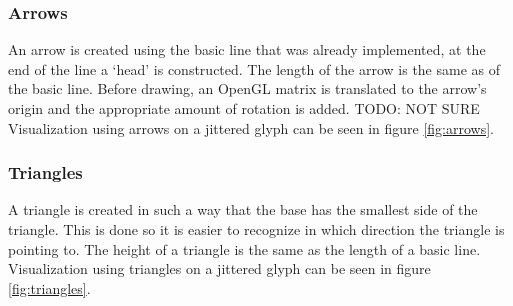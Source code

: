 		\subsubsection*{Arrows}
			An arrow is created using the basic line that was already implemented, at the end of the line a `head' is constructed.
			The length of the arrow is the same as of the basic line. 
			Before drawing, an OpenGL matrix is translated to the arrow's origin and the appropriate amount of rotation is added. TODO: NOT SURE
			Visualization using arrows on a jittered glyph can be seen in figure \ref{fig:arrows}.


		\subsubsection*{Triangles}
			A triangle is created in such a way that the base has the smallest side of the triangle.
			This is done so it is easier to recognize in which direction the triangle is pointing to.
			The height of a triangle is the same as the length of a basic line.
			Visualization using triangles on a jittered glyph can be seen in figure \ref{fig:triangles}.
